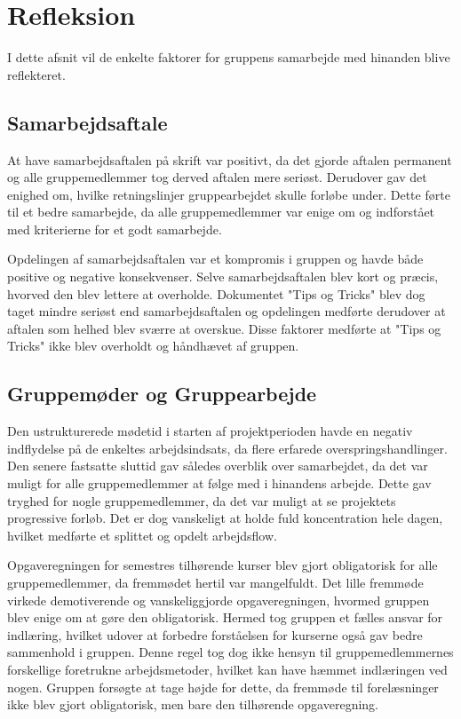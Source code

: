 \section{Refleksion}
I dette afsnit vil de enkelte faktorer for gruppens samarbejde med hinanden blive reflekteret.

\subsection{Samarbejdsaftale}
At have samarbejdsaftalen på skrift var positivt, da det gjorde aftalen permanent og alle gruppemedlemmer tog derved aftalen mere seriøst. Derudover gav det enighed om, hvilke retningslinjer gruppearbejdet skulle forløbe under. Dette førte til et bedre samarbejde, da alle gruppemedlemmer var enige om og indforstået med kriterierne for et godt samarbejde.

Opdelingen af samarbejdsaftalen var et kompromis i gruppen og havde både positive og negative konsekvenser. Selve samarbejdsaftalen blev kort og præcis, hvorved den blev lettere at overholde. Dokumentet "Tips og Tricks" blev dog taget mindre seriøst end samarbejdsaftalen og opdelingen medførte derudover at aftalen som helhed blev sværre at overskue. Disse faktorer medførte at "Tips og Tricks" ikke blev  overholdt og håndhævet af gruppen.

\subsection{Gruppemøder og Gruppearbejde}
Den ustrukturerede mødetid i starten af projektperioden havde en negativ indflydelse på de enkeltes arbejdsindsats, da flere erfarede overspringshandlinger. Den senere fastsatte sluttid gav således overblik over samarbejdet, da det var muligt for alle gruppemedlemmer at følge med i hinandens arbejde. Dette gav tryghed for nogle gruppemedlemmer, da det var muligt at se projektets progressive forløb. Det er dog vanskeligt at holde fuld koncentration hele dagen, hvilket medførte et splittet og opdelt arbejdsflow.

Opgaveregningen for semestres tilhørende kurser blev gjort obligatorisk for alle gruppemedlemmer, da fremmødet hertil var mangelfuldt. Det lille fremmøde virkede demotiverende og vanskeliggjorde opgaveregningen, hvormed gruppen blev enige om at gøre den obligatorisk. Hermed tog gruppen et fælles ansvar for indlæring, hvilket udover at forbedre forståelsen for kurserne også gav bedre sammenhold i gruppen. Denne regel tog dog ikke hensyn til gruppemedlemmernes forskellige foretrukne arbejdsmetoder, hvilket kan have hæmmet indlæringen ved nogen. Gruppen forsøgte at tage højde for dette, da fremmøde til forelæsninger ikke blev gjort obligatorisk, men bare den tilhørende opgaveregning.

